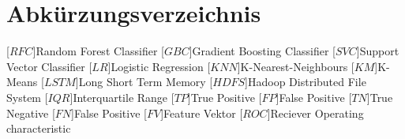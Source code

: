 \clearpage
\chapter*{Abkürzungsverzeichnis}\label{abkuerzungsverzeichnis}
\begin{acronym}[YTM]
\setlength{\itemsep}{-\parsep}

[$RFC$]{\hspace{1cm}Random Forest Classifier}
[$GBC$]{\hspace{1cm}Gradient Boosting Classifier}
[$SVC$]{\hspace{1cm}Support Vector Classifier}
[$LR$]{\hspace{1cm}Logistic Regression}
[$KNN$]{\hspace{0.825cm}K-Nearest-Neighbours}
[$KM$]{\hspace{0.825cm}K-Means}
[$LSTM$]{\hspace{0.625cm}Long Short Term Memory}
[$HDFS$]{\hspace{0.625cm}Hadoop Distributed File System}
[$IQR$]{\hspace{1cm}Interquartile Range}
[$TP$]{\hspace{1cm}True Positive}
[$FP$]{\hspace{1cm}False Positive}
[$TN$]{\hspace{1cm}True Negative}
[$FN$]{\hspace{1cm}False Positive}
[$FV$]{\hspace{1cm}Feature Vektor}
[$ROC$]{\hspace{1cm}Reciever Operating characteristic}






\end{acronym}